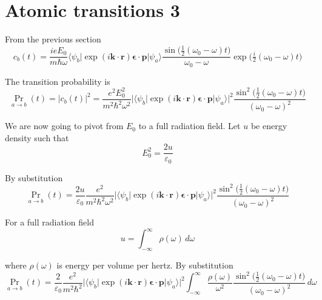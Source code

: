 

\section*{Atomic transitions 3}

From the previous section
\begin{equation*}
c_b(t)=\frac{ieE_0}{m\hbar\omega}
\langle\psi_b|\exp(i\mathbf k\cdot\mathbf r)\boldsymbol{\epsilon}\cdot\mathbf p|\psi_a\rangle
\frac{\sin\bigl(\tfrac{1}{2}(\omega_0-\omega)t\bigr)}{\omega_0-\omega}
\exp\bigl(\tfrac{i}{2}(\omega_0-\omega)t\bigr)
\end{equation*}

The transition probability is
\begin{equation*}
\Pr_{a\rightarrow b}(t)=|c_b(t)|^2
=\frac{e^2E_0^2}{m^2\hbar^2\omega^2}
\bigl|\langle\psi_b|\exp(i\mathbf k\cdot\mathbf r)\boldsymbol{\epsilon}\cdot\mathbf p|\psi_a\rangle\bigr|^2
\frac{\sin^2\bigl(\tfrac{1}{2}(\omega_0-\omega)t\bigr)}{(\omega_0-\omega)^2}
\end{equation*}

We are now going to pivot from $E_0$ to a full radiation field.
Let $u$ be energy density such that
\begin{equation*}
E_0^2=\frac{2u}{\varepsilon_0}
\end{equation*}

By substitution
\begin{equation*}
\Pr_{a\rightarrow b}(t)
=\frac{2u}{\varepsilon_0}
\frac{e^2}{m^2\hbar^2\omega^2}
\bigl|\langle\psi_b|\exp(i\mathbf k\cdot\mathbf r)\boldsymbol{\epsilon}\cdot\mathbf p|\psi_a\rangle\bigr|^2
\frac{\sin^2\bigl(\tfrac{1}{2}(\omega_0-\omega)t\bigr)}{(\omega_0-\omega)^2}
\end{equation*}

For a full radiation field
\begin{equation*}
u=\int_{-\infty}^\infty\rho(\omega)\,d\omega
\end{equation*}

where $\rho(\omega)$ is energy per volume per hertz.
By substitution
\begin{equation*}
\Pr_{a\rightarrow b}(t)
=\frac{2}{\varepsilon_0}
\frac{e^2}{m^2\hbar^2}
\bigl|\langle\psi_b|\exp(i\mathbf k\cdot\mathbf r)\boldsymbol{\epsilon}\cdot\mathbf p|\psi_a\rangle\bigr|^2
\int_{-\infty}^\infty
\frac{\rho(\omega)}{\omega^2}
\frac{\sin^2\bigl(\tfrac{1}{2}(\omega_0-\omega)t\bigr)}{(\omega_0-\omega)^2}\,d\omega
\end{equation*}

